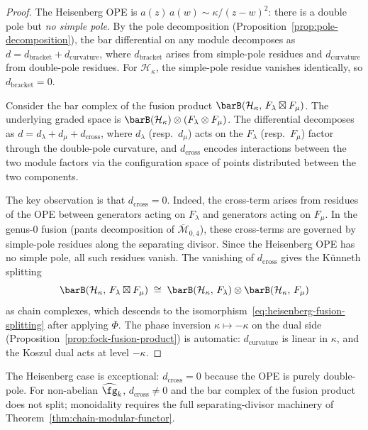 \begin{proof}
The Heisenberg OPE is $a(z)\,a(w) \sim \kappa/(z-w)^2$: there
is a double pole but \emph{no simple pole}.  By the pole
decomposition
(Proposition~\ref{prop:pole-decomposition}), the bar
differential on any module decomposes as
$d = d_{\mathrm{bracket}} + d_{\mathrm{curvature}}$, where
$d_{\mathrm{bracket}}$ arises from simple-pole residues and
$d_{\mathrm{curvature}}$ from double-pole residues.  For
$\mathcal{H}_\kappa$, the simple-pole residue vanishes
identically, so $d_{\mathrm{bracket}} = 0$.

Consider the bar complex of the fusion product
$\barB(\mathcal{H}_\kappa,\, F_\lambda \boxtimes F_\mu)$.
The underlying graded space is
$\barB(\mathcal{H}_\kappa) \otimes (F_\lambda \otimes F_\mu)$.
The differential decomposes as
$d = d_\lambda + d_\mu + d_{\mathrm{cross}}$,
where $d_\lambda$ (resp.\ $d_\mu$) acts on the
$F_\lambda$ (resp.\ $F_\mu$) factor through the double-pole
curvature, and $d_{\mathrm{cross}}$ encodes interactions between
the two module factors via the configuration space of points
distributed between the two components.

The key observation is that $d_{\mathrm{cross}} = 0$.  Indeed,
the cross-term arises from residues of the OPE between
generators acting on $F_\lambda$ and generators acting on
$F_\mu$.  In the genus-$0$ fusion (pants decomposition of
$\overline{\mathcal{M}}_{0,4}$), these cross-terms are governed
by simple-pole residues along the separating divisor.  Since
the Heisenberg OPE has no simple pole, all such residues
vanish.  The vanishing of $d_{\mathrm{cross}}$ gives the
K\"unneth splitting
\[
\barB(\mathcal{H}_\kappa,\, F_\lambda \boxtimes F_\mu)
\;\cong\;
\barB(\mathcal{H}_\kappa,\, F_\lambda)
\otimes
\barB(\mathcal{H}_\kappa,\, F_\mu)
\]
as chain complexes, which descends to the
isomorphism~\eqref{eq:heisenberg-fusion-splitting} after
applying $\Phi$.  The phase inversion
$\kappa \mapsto -\kappa$ on the dual side
(Proposition~\ref{prop:fock-fusion-product}) is automatic:
$d_{\mathrm{curvature}}$ is linear in $\kappa$, and the
Koszul dual acts at level $-\kappa$.
\end{proof}

\begin{remark}\label{rem:heisenberg-fusion-simplicity}
The Heisenberg case is exceptional: $d_{\mathrm{cross}} = 0$ because the OPE is purely double-pole.  For non-abelian $\widehat{\fg}_k$, $d_{\mathrm{cross}} \neq 0$ and the bar complex of the fusion product does not split; monoidality requires the full separating-divisor machinery of Theorem~\ref{thm:chain-modular-functor}.
\end{remark}

